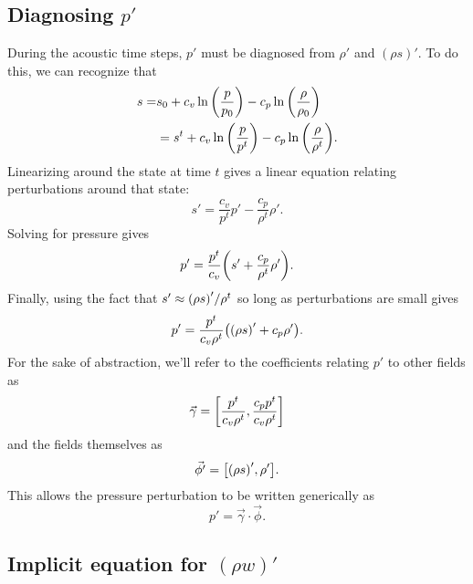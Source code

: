 \documentclass[11pt]{article}
\begin{document}
\subsection{Diagnosing $p'$}

During the acoustic time steps, $p'$ must be diagnosed from $\rho'$ and $(\rho s)'$. To do this, we can recognize that
\begin{align*}
s =& s_0 + c_v \ln \qty (\frac{p}{p_0}) - c_p \ln \qty(\frac{\rho}{\rho_0}) \\
&= s^t + c_v \ln \qty (\frac{p}{p^t}) - c_p \ln \qty(\frac{\rho}{\rho^t}).
\end{align*}
Linearizing around the state at time $t$ gives a linear equation relating perturbations around that state:
\begin{equation*}
s' = \frac{c_v}{p^t} p' - \frac{c_p}{\rho^t} \rho'.
\end{equation*}
Solving for pressure gives
\begin{equation*}
p' = \frac{p^t}{c_v} \qty (s' + \frac{c_p}{\rho^t} \rho').
\end{equation*}
Finally, using the fact that $s' \approx \qty(\rho s)' / \rho^t$ so long as perturbations are small gives
\begin{equation}
p' = \frac{p^t}{c_v \rho^t} \qty ( \qty(\rho s)' + c_p \rho').
\end{equation}
For the sake of abstraction, we'll refer to the coefficients relating $p'$ to other fields as
\begin{equation*}
\vec{\gamma} = \qty [\frac{p^t}{c_v \rho^t}, \frac{c_p p^t}{c_v \rho^t} ]
\end{equation*}
and the fields themselves as
\begin{equation*}
\vec{\phi'} = \qty [\qty(\rho s)', \rho'].
\end{equation*}
This allows the pressure perturbation to be written generically as
\begin{equation}
p' = \vec{\gamma} \cdot \vec{\phi}.
\end{equation}

\subsection{Implicit equation for $(\rho w)'$}
\end{document}
